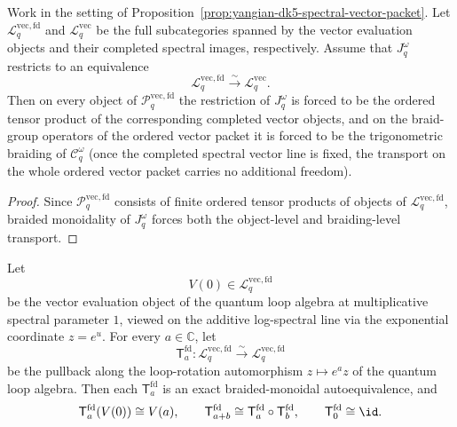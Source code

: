 \begin{proposition}
\label{prop:yangian-dk5-spectral-vector-line}
Work in the setting of
Proposition~\ref{prop:yangian-dk5-spectral-vector-packet}. Let
\(\mathcal{L}^{\mathrm{vec,fd}}_{q}\) and
\(\mathcal{L}^{\mathrm{vec}}_{q}\) be the full subcategories
spanned by the vector evaluation objects and their completed spectral
images, respectively.
Assume that \(J_q^\omega\)
restricts to an equivalence
\[
\mathcal{L}^{\mathrm{vec,fd}}_{q}
\xrightarrow{\sim}
\mathcal{L}^{\mathrm{vec}}_{q}.
\]
Then on every object of \(\mathcal{P}^{\mathrm{vec,fd}}_{q}\) the
restriction of \(J_q^\omega\) is forced to be the ordered tensor
product of the corresponding completed vector objects, and on the
braid-group operators of the ordered vector packet it is forced to be
the trigonometric braiding of \(\mathcal{C}_q^\omega\)
(once the completed spectral vector line is fixed,
the transport on the whole ordered vector packet carries no additional freedom).
\end{proposition}

\begin{proof}
Since \(\mathcal{P}^{\mathrm{vec,fd}}_{q}\) consists of finite ordered
tensor products of objects of \(\mathcal{L}^{\mathrm{vec,fd}}_{q}\),
braided monoidality of \(J_q^\omega\) forces both the object-level and
braiding-level transport.
\end{proof}

\begin{proposition}
\label{prop:quantum-fd-vector-seed-shifts}
Let
\[
V(0)\in \mathcal{L}^{\mathrm{vec,fd}}_{q}
\]
be the vector evaluation object of the quantum loop algebra at
multiplicative spectral parameter \(1\), viewed on the additive
log-spectral line via the exponential coordinate \(z=e^u\). For every
\(a\in \mathbb{C}\), let
\[
\mathsf{T}^{\mathrm{fd}}_a\colon
\mathcal{L}^{\mathrm{vec,fd}}_{q}\xrightarrow{\sim}
\mathcal{L}^{\mathrm{vec,fd}}_{q}
\]
be the pullback along the loop-rotation automorphism \(z\mapsto e^a z\)
of the quantum loop algebra. Then each
\(\mathsf{T}^{\mathrm{fd}}_a\) is an exact braided-monoidal
autoequivalence, and
\[
\mathsf{T}^{\mathrm{fd}}_a(V(0))\cong V(a),
\qquad
\mathsf{T}^{\mathrm{fd}}_{a+b}\cong
\mathsf{T}^{\mathrm{fd}}_a\circ \mathsf{T}^{\mathrm{fd}}_b,
\qquad
\mathsf{T}^{\mathrm{fd}}_0\cong \id .
\]

\end{proposition}

